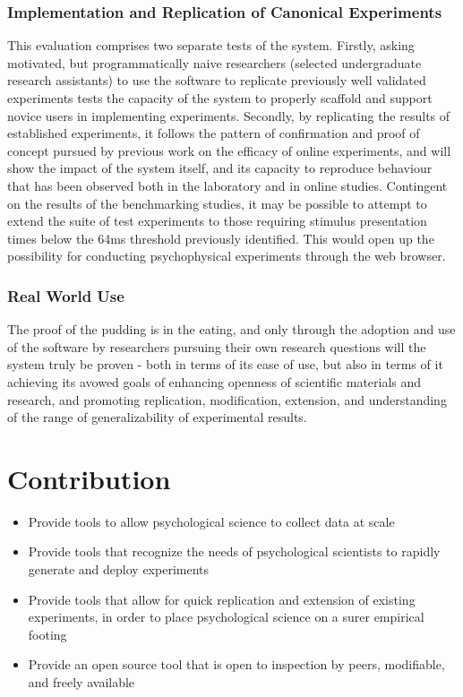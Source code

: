 \documentclass[12pt,a4paper,titlepage]{scrreprt}
\begin{document}
\subsection{Implementation and Replication of Canonical Experiments}
This evaluation comprises two separate tests of the system. Firstly, asking motivated, but programmatically naive researchers (selected undergraduate research assistants) to use the software to replicate previously well validated experiments tests the capacity of the system to properly scaffold and support novice users in implementing experiments.
Secondly, by replicating the results of established experiments, it follows the pattern of confirmation and proof of concept pursued by previous work on the efficacy of online experiments\cite{germine_is_2012,crump_evaluating_2013}, and will show the impact of the system itself, and its capacity to reproduce behaviour that has been observed  both in the laboratory and in online studies.
Contingent on the results of the benchmarking studies, it may be possible to attempt to extend the suite of test experiments to those requiring stimulus presentation times below the 64ms threshold previously identified\cite{crump_evaluating_2013}. This would open up the possibility for conducting psychophysical experiments through the web browser.
\subsection{Real World Use}
The proof of the pudding is in the eating, and only through the adoption and use of the software by researchers pursuing their own research questions will the system truly be proven - both in terms of its ease of use, but also in terms of it achieving its avowed goals of enhancing openness of scientific materials and research, and promoting replication, modification, extension, and understanding of the range of generalizability of experimental results.
\chapter{Contribution}
\begin{itemize}
\item Provide tools to allow psychological science to collect data at scale
\item Provide tools that recognize the needs of psychological scientists to rapidly generate and deploy experiments
\item Provide tools that allow for quick replication and extension of existing experiments, in order to place psychological science on a surer empirical footing
\item Provide an open source tool that is open to inspection by peers, modifiable, and freely available
\end{itemize}
      
    \nocite{*}
    
    {}
\end{document}
